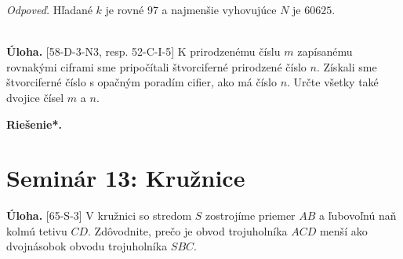 \documentclass[11pt,a4paper,oneside,final]{book}
\newcommand{\ul}{\textbf{Úloha.} }
\newcommand{\rieh}{\textbf{Riešenie*.} }
\begin{document}
\textit{Odpoveď.} Hľadané $k$ je rovné 97 a najmenšie vyhovujúce $N$ je $60 625$.\\
\\
\begin{tcolorbox}[breakable,notitle,boxrule=0pt,colback=light-gray,colframe=light-gray]\ul [58-D-3-N3, resp. 52-C-I-5] K prirodzenému číslu $m$ zapísanému rovnakými ciframi sme pripočítali štvorciferné prirodzené číslo $n$. Získali sme štvorciferné číslo s opačným poradím cifier, ako má číslo $n$. Určte všetky také dvojice čísel $m$ a $n$.

\end{tcolorbox}

\rieh

\section*{Seminár 13: Kružnice}
\begin{tcolorbox}[breakable,notitle,boxrule=0pt,colback=light-gray,colframe=light-gray]\ul [65-S-3] V kružnici so stredom $S$ zostrojíme priemer $AB$ a ľubovoľnú naň kolmú tetivu $CD$. Zdôvodnite, prečo je obvod trojuholníka $ACD$ menší ako dvojnásobok obvodu trojuholníka $SBC$.

\end{tcolorbox}
\end{document}
